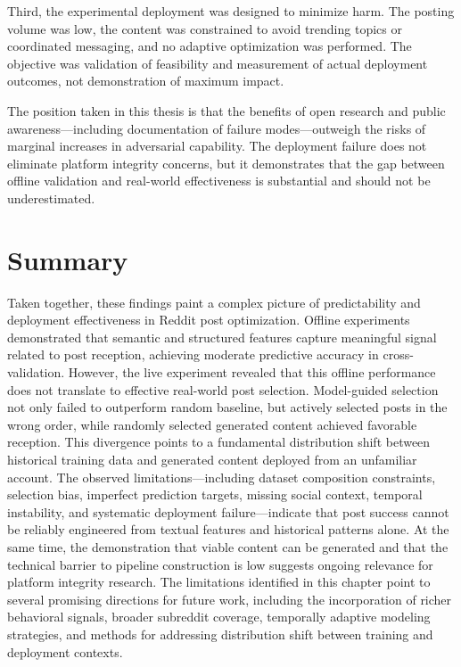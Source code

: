 Third, the experimental deployment was designed to minimize harm. The posting volume was low, the content was constrained to avoid trending topics or coordinated messaging, and no adaptive optimization was performed. The objective was validation of feasibility and measurement of actual deployment outcomes, not demonstration of maximum impact.

The position taken in this thesis is that the benefits of open research and public awareness—including documentation of failure modes—outweigh the risks of marginal increases in adversarial capability. The deployment failure does not eliminate platform integrity concerns, but it demonstrates that the gap between offline validation and real-world effectiveness is substantial and should not be underestimated.

\section{Summary}

Taken together, these findings paint a complex picture of predictability and deployment effectiveness in Reddit post optimization. Offline experiments demonstrated that semantic and structured features capture meaningful signal related to post reception, achieving moderate predictive accuracy in cross-validation. However, the live experiment revealed that this offline performance does not translate to effective real-world post selection. Model-guided selection not only failed to outperform random baseline, but actively selected posts in the wrong order, while randomly selected generated content achieved favorable reception. This divergence points to a fundamental distribution shift between historical training data and generated content deployed from an unfamiliar account. The observed limitations—including dataset composition constraints, selection bias, imperfect prediction targets, missing social context, temporal instability, and systematic deployment failure—indicate that post success cannot be reliably engineered from textual features and historical patterns alone. At the same time, the demonstration that viable content can be generated and that the technical barrier to pipeline construction is low suggests ongoing relevance for platform integrity research. The limitations identified in this chapter point to several promising directions for future work, including the incorporation of richer behavioral signals, broader subreddit coverage, temporally adaptive modeling strategies, and methods for addressing distribution shift between training and deployment contexts.